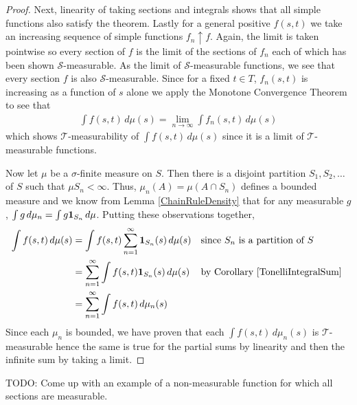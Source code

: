\begin{proof}
Next, linearity of taking sections and integrals shows that all simple functions
also satisfy the theorem.  Lastly for a general positive $f(s,t)$ we
take an increasing sequence of simple functions $f_n \uparrow f$.
Again, the limit is taken pointwise so every section of $f$ is the
limit of the sections of $f_n$ each of which has been shown
$\mathcal{S}$-measurable.  As the limit of $\mathcal{S}$-measurable
functions, we see that every section $f$ is also
$\mathcal{S}$-measurable.  Since for a fixed $t \in T$, $f_n(s,t)$ is
increasing as a function of $s$ alone we apply the Monotone
Convergence Theorem to see that
\begin{align*}
\int f(s,t) \, d\mu(s) = \lim_{n \to \infty} \int f_n(s,t) \, d\mu(s)
\end{align*}
which shows $\mathcal{T}$-measurability of $\int f(s,t) \, d\mu(s)$
since it is a limit of $\mathcal{T}$-measurable functions.

Now let $\mu$ be a $\sigma$-finite measure on $S$.  Then there is a
disjoint partition $S_1, S_2, \dots$ of $S$ such that $\mu S_n <
\infty$.  Thus, $\mu_n (A) = \mu(A \cap S_n)$ defines a bounded
measure and we know from Lemma \ref{ChainRuleDensity} that for any
measurable $g$, $\int g \, d\mu_n = \int g
\textbf{1}_{S_n} \, d\mu$.
Putting these observations together,
\begin{align*}
\int f(s,t) \,  d \mu(s) &= \int f(s,t) \sum_{n=1}^\infty
\textbf{1}_{S_n}(s) \,  d \mu(s) & & \text{since $S_n$ is a partition
  of $S$} \\
&= \sum_{n=1}^\infty \int f(s,t) 
\textbf{1}_{S_n}(s) \,  d \mu(s) & & \text{by Corollary 
  \ref{TonelliIntegralSum} } \\
&= \sum_{n=1}^\infty \int f(s,t) \,  d \mu_n(s) 
\end{align*}
Since each $\mu_n$ is bounded, we have proven that each $\int f(s,t) \,  d \mu_n(s) $ is
$\mathcal{T}$-measurable hence the same is true for the partial sums
by linearity and then the infinite sum by taking a limit.
\end{proof}

TODO: Come up with an example of a non-measurable function for which all sections are measurable.

